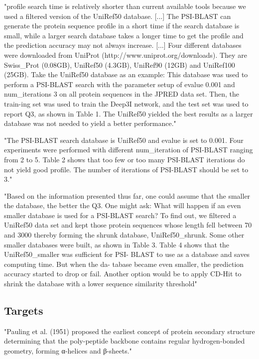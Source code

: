  "profile search time is relatively shorter than current available tools because we used a filtered version of the UniRef50 database. [...]
 The PSI-BLAST can generate the protein sequence profile in a short time if the search database is small, while a larger search database takes a longer time to get the profile and the prediction accuracy may not always increase. [...] Four different databases were downloaded from UniProt (http://www.uniprot.org/downloads). They are Swiss\_Prot (0.08GB), UniRef50 (4.3GB), UniRef90 (12GB) and UniRef100 (25GB). Take the UniRef50 database as an example: This database was used to perform a PSI-BLAST search with the parameter setup of evalue 0.001 and num\_iterations 3 on all protein sequences in the JPRED data set. Then, the train-ing set was used to train the Deep3I network, and the test set was used to report Q3, as shown in Table 1. The UniRef50 yielded the best results as a larger database was not needed to yield a better performance." \cite{Fang2017}

 "The PSI-BLAST search database is UniRef50 and evalue is set to 0.001. Four experiments were performed with different num\_iteration of PSI-BLAST ranging from 2 to 5. Table 2 shows that too few or too many PSI-BLAST iterations do not yield good profile. The number of iterations of PSI-BLAST should be set to 3." \cite{Fang2017}

 "Based on the information presented thus far, one could assume that the smaller the database, the better the Q3. One might ask: What will happen if an even smaller database is used for a PSI-BLAST search? To find out, we filtered a UniRef50 data set and kept those protein sequences whose length fell between 70 and 3000 thereby forming the shrunk database, UniRef50\_shrunk. Some other smaller databases were built, as shown in Table 3. Table 4 shows that the UniRef50\_smaller was sufficient for PSI- BLAST to use as a database and saves computing time. But when the da- tabase became even smaller, the prediction accuracy started to drop or fail. Another option would be to apply CD-Hit to shrink the database with a lower sequence similarity threshold" \cite{Fang2017}


 \subsection{Targets}
 "Pauling et al. (1951) proposed the earliest concept of protein secondary structure determining that the poly-peptide backbone contains regular hydrogen-bonded geometry, forming α-helices and β-sheets." \cite{Fang2017}

